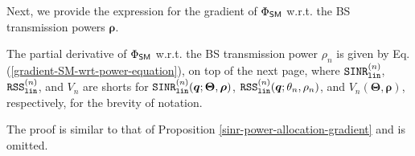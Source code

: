 Next, we provide the expression for the gradient of $\Phi_{{\sf SM}}$ w.r.t. the BS transmission powers $\bm{\rho}$.

\begin{Proposition}\label{gradient-SM-wrt-power}
    The partial derivative of $\Phi_{{\sf SM}}$ w.r.t. the BS transmission power $\rho_n$ is given by Eq. (\ref{gradient-SM-wrt-power-equation}), on top of the next page,
where $\mathtt{SINR}^{(n)}_{\mathtt{lin}} $, $\mathtt{RSS}^{(n)}_{\mathtt{lin}}$, and $V_n$ are shorts for $\mathtt{SINR}^{(n)}_{\mathtt{lin}}(\bm{q}; \bm{\Theta}, \bm{\rho})$, $\mathtt{RSS}^{(n)}_{\mathtt{lin}}(\bm{q}; \theta_n, \rho_n)$, and $V_n(\bm{\Theta}, \bm{\rho})$, respectively, for the brevity of notation.
\end{Proposition}
\noindent The proof is similar to that of Proposition \ref{sinr-power-allocation-gradient} and is omitted.



